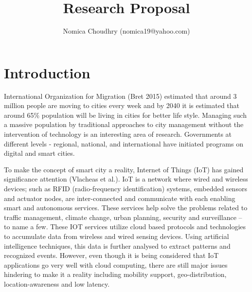 \documentclass[10pt]{llncs}
\begin{document}
%
\title{Research Proposal}
%
\author{
Nomica Choudhry (\selectfont\ttfamily\upshape nomica19@yahoo.com)\\
}
\maketitle
%
\section{Introduction}
International Organization for Migration (Bret 2015) estimated that around 3 million people are moving to cities every week and by 2040 it is estimated that around 65\% population will be living in cities for better life style. Managing such a massive population by traditional approaches to city management without the intervention of technology is an interesting area of research. Governments at different levels - regional, national, and international have initiated programs on digital and smart cities.

To make the concept of smart city a reality, Internet of Things (IoT) has gained significance attention (Vlacheas et al.). IoT is a network where wired and wireless devices; such as RFID (radio-frequency identification) systems, embedded sensors and actuator nodes, are inter-connected and communicate with each enabling smart and autonomous services. These services help solve the problems related to traffic management, climate change, urban planning, security and surveillance – to name a few. These IOT services utilize cloud based protocols and technologies to accumulate data from wireless and wired sensing devices. Using artificial intelligence techniques, this data is further analysed to extract patterns and recognized events. However, even though it is being considered that IoT applications go very well with cloud computing, there are still major issues hindering to make it a reality including mobility support, geo-distribution, location-awareness and low latency. 
\end{document}
